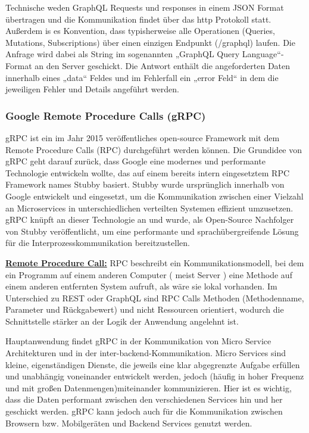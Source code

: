 Technische weden GraphQL Requests und responses in einem JSON Format übertragen und die Kommunikation findet über das http Protokoll statt. Außerdem is es Konvention, dass typisherweise alle Operationen (Queries, Mutations, Subscriptions) über einen einzigen Endpunkt (/graphql) laufen.
Die Anfrage wird dabei als String im sogenannten „GraphQL Query Language“-Format an den Server geschickt. Die Antwort enthält die angeforderten Daten innerhalb eines „data“ Feldes und im Fehlerfall ein „error Feld“ in dem die jeweiligen Fehler und Details angeführt werden.

\clearpage
\subsubsection{Google Remote Procedure Calls (gRPC)}
gRPC ist ein im Jahr 2015 veröffentliches open-source Framework mit dem Remote Procedure Calls (RPC) durchgeführt werden können. Die Grundidee von gRPC geht darauf zurück, dass Google eine modernes und performante Technologie entwickeln wollte, das auf einem bereits intern eingesetztem RPC Framework names Stubby basiert. 
Stubby wurde ursprünglich innerhalb von Google entwickelt und eingesetzt, um die Kommunikation zwischen einer Vielzahl an Microservices in unterschiedlichen verteilten Systemen effizient umzusetzen. gRPC knüpft an dieser Technologie an und wurde, als Open-Source Nachfolger von Stubby veröffentlicht, um eine performante und sprachübergreifende Lösung für die Interprozesskommunikation bereitzustellen.

\textbf{\underline{Remote Procedure Call:}}
RPC beschreibt ein Kommunikationsmodell, bei dem ein Programm auf einem anderen Computer ( meist Server ) eine Methode auf einem anderen entfernten System aufruft, als wäre sie lokal vorhanden. Im Unterschied zu REST oder GraphQL sind RPC Calls Methoden (Methodenname, Parameter und Rückgabewert) und nicht Ressourcen orientiert, wodurch die Schnittstelle stärker an der Logik der Anwendung angelehnt ist. 

Hauptanwendung findet gRPC in der Kommunikation von Micro Service Architekturen und in der inter-backend-Kommunikation. Micro Services sind kleine, eigenständigen Dienste, die jeweils eine klar abgegrenzte Aufgabe erfüllen und unabhängig voneinander entwickelt werden, jedoch (häufig in hoher Frequenz und mit großen Datenmengen)miteinander kommunizieren. Hier ist es wichtig, dass die Daten performant zwischen den verschiedenen Services hin und her geschickt werden. gRPC kann jedoch auch für die Kommunikation zwischen Browsern bzw. Mobilgeräten und Backend Services genutzt werden.

